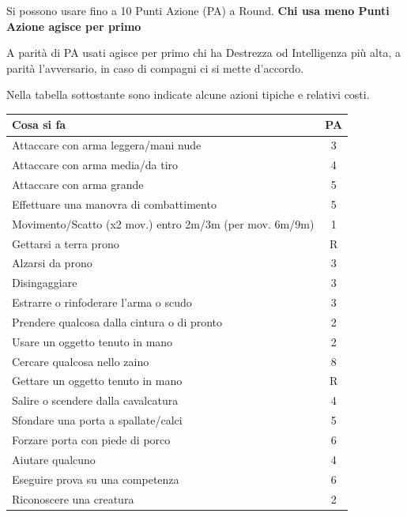 \documentclass[a4paper,twoside,openany]{book}
\begin{document}
Si possono usare fino a 10 Punti Azione (PA) a Round. \textbf{Chi usa meno Punti Azione agisce per primo}

A parità di PA usati agisce per primo chi ha Destrezza od Intelligenza più alta, a parità l'avversario, in caso di compagni ci si mette d'accordo.

Nella tabella sottostante sono indicate alcune azioni tipiche e relativi costi.

\medskip

\noindent\begin{tabularx}{1\linewidth}{Xc}
	\toprule
	\rowcolor{gray!20}\textbf{Cosa si fa} & \textbf{PA}\\
	\toprule
	Attaccare con arma leggera/mani nude& 3\\
	\rowcolor{gray!20}Attaccare con arma media/da tiro& 4\\
	Attaccare con arma grande& 5\\
	\rowcolor{gray!20}Effettuare una manovra di combattimento & 5\\
	\midrule
	Movimento/Scatto (x2 mov.) entro 2m/3m (per mov. 6m/9m) &1\\
	\rowcolor{gray!20}Gettarsi a terra prono& R\\
	Alzarsi da prono& 3\\
	\rowcolor{gray!20}Disingaggiare & 3\\
	\midrule
	Estrarre o rinfoderare l'arma o scudo& 3\\
	\rowcolor{gray!20}Prendere qualcosa dalla cintura o di pronto& 2\\
	Usare un oggetto tenuto in mano& 2\\
	\rowcolor{gray!20}Cercare qualcosa nello zaino& 8\\
	Gettare un oggetto tenuto in mano& R\\
	\midrule
	\rowcolor{gray!20}Salire o scendere dalla cavalcatura& 4\\
	\midrule
	Sfondare una porta a spallate/calci& 5\\
	\rowcolor{gray!20}Forzare porta con piede di porco& 6\\
	\midrule
	Aiutare qualcuno& 4\\
	\rowcolor{gray!20}Eseguire prova su una competenza& 6\\
	Riconoscere una creatura& 2\\

\end{tabularx}
\end{document}

